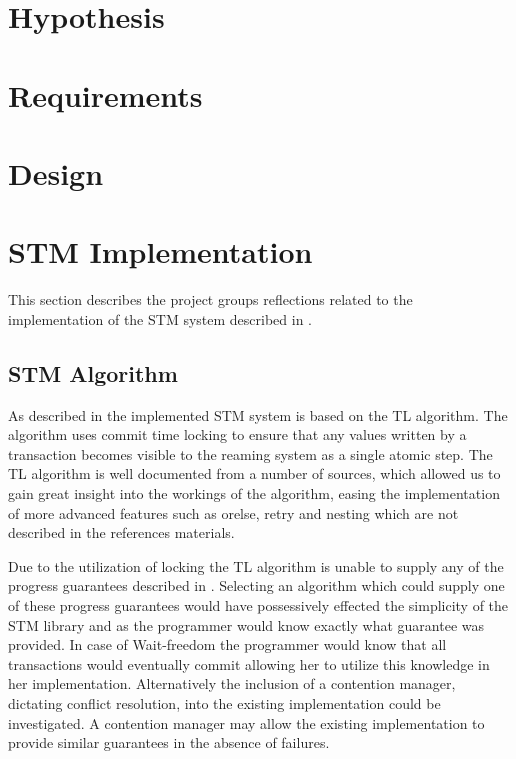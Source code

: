 \section{Hypothesis}
\section{Requirements}
\section{Design}
\section{STM Implementation}
This section describes the project groups reflections related to the implementation of the \ac{STM} system described in .

\subsection{STM Algorithm}
As described in  the implemented \ac{STM} system is based on the TL algorithm\cite{dice2006transactional}. The algorithm uses commit time locking to ensure that any values written by a transaction becomes visible to the reaming system as a single atomic step. The TL algorithm is well documented from a number of sources\cite{dice2006transactional}\cite[p. 438]{herlihy2012art}\cite[p. 106]{harris2010transactional}, which allowed us to gain great insight into the workings of the algorithm, easing the implementation of more advanced features such as orelse, retry and nesting which are not described in the references materials.

Due to the utilization of locking the TL algorithm is unable to supply any of the progress guarantees described in . Selecting an algorithm which could supply one of these progress guarantees would have possessively effected the simplicity of the \ac{STM} library and \stmname as the programmer would know exactly what guarantee was provided. In case of Wait-freedom the programmer would know that all transactions would eventually commit allowing her to utilize this knowledge in her implementation. Alternatively the inclusion of a contention manager, dictating conflict resolution, into the existing implementation could be investigated. A contention manager may allow the existing implementation to provide similar guarantees in the absence of failures.

